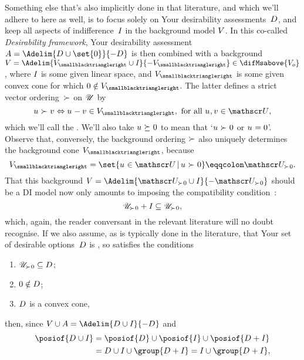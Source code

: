 \documentclass[preprint]{isipta2025}
\begin{document}
Something else that's also implicitly done in that literature, and which we'll adhere to here as well, is to focus solely on Your desirability assessments~\(D_{}\), and keep all aspects of indifference~\(I_{}\) in the background model \(V\).
In this co-called \emph{Desirability framework}, Your desirability assessment \(\A=\Adelim{\desirset\cup\set{0}}{-\desirset}\) is then combined with a background \(\bgM=\Adelim{\bgM_\des\cup\indifset}{-\bgM_\des}\in\difMsabove{\zeroM}\), where \(I_{}\) is some given linear space, and \(\bgM_\des\) is some given convex cone for which \(0\notin\bgM_\des\).
The latter defines a strict vector ordering~\(\mathrel{\succ_{}}\) on \(\mathscr{U}\) by
\[
\opt\optgt\altopt
\ifandonlyif
\opt-\altopt\in\bgM_\des,
\text{ for all \(\opt,\altopt\in\opts\)},
\]
which we'll call the .
We'll also take \(u_{}\mathrel{\succeq_{}}0\) to mean that `\(u_{}\mathrel{\succ_{}}0\) or \(u_{}=0\)'.
Observe that, conversely, the background ordering \(\mathrel{\succ_{}}\) also uniquely determines the background cone \(\bgM_\des\), because
\[
\bgM_\des
=\set{\opt\in\opts\given\opt\optgt0}
\eqqcolon\posopts.
\]
That this background \(\bgM=\Adelim{\posopts\cup\indifset}{-\posopts}\) should be a DI model now only amounts to imposing the compatibility condition~:
\begin{equation}\label{eq:background:compatibility}
\mathscr{U}_{\mathrel{\succ_{}}0}+I_{}\subseteq\mathscr{U}_{\mathrel{\succ_{}}0},
\end{equation}
which, again, the reader conversant in the relevant literature will no doubt recognise.
If we also assume, as is typically done in the literature, that Your set of desirable options~\(D_{}\) is , so satisfies the conditions
\begin{enumerate}[label={\upshape D\arabic*.},ref={\upshape D\arabic*},series=D,widest=3,leftmargin=*,itemsep=0pt]
\item\label{axiom:D:background} \(\mathscr{U}_{\mathrel{\succ_{}}0}\subseteq D_{}\);
\item\label{axiom:D:zero:not:desirable} \(0\notin D_{}\);
\item\label{axiom:D:deductive:closedness} \(D_{}\) is a convex cone,
\end{enumerate}
then, since \(\bgM\cup\A=\Adelim{\desirset\cup\indifset}{-\desirset}\) and
\begin{align*}
\posiof{\desirset\cup\indifset}
&=\posiof{\desirset}\cup\posiof{\indifset}\cup\posiof{\desirset+\indifset}\\
&=\desirset\cup\indifset\cup\group{\desirset+\indifset}
=\indifset\cup\group{\desirset+\indifset},
\end{align*}
\end{document}
